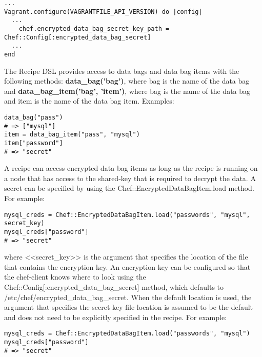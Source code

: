 \begin{lstlisting}[label=lst:my-cloud-chef-databag12,title=my-cloud/Vagrantfile]
...
Vagrant.configure(VAGRANTFILE_API_VERSION) do |config|
  ...
    chef.encrypted_data_bag_secret_key_path = Chef::Config[:encrypted_data_bag_secret]
  ...
end
\end{lstlisting}

The Recipe DSL provides access to data bags and data bag items with the following methods: \textbf{data\_bag('bag')}, where bag is the name of the data bag and \textbf{data\_bag\_item('bag', 'item')}, where bag is the name of the data bag and item is the name of the data bag item. Examples:

\begin{lstlisting}[label=lst:my-cloud-chef-databag13,title=my-cloud/Vagrantfile]
data_bag("pass")
# => ["mysql"]
item = data_bag_item("pass", "mysql")
item["password"]
# => "secret"
\end{lstlisting}

A recipe can access encrypted data bag items as long as the recipe is running on a node that has access to the shared-key that is required to decrypt the data. A secret can be specified by using the Chef::EncryptedDataBagItem.load method. For example:

\begin{lstlisting}[label=lst:my-cloud-chef-databag14,title=my-cloud/Vagrantfile]
mysql_creds = Chef::EncryptedDataBagItem.load("passwords", "mysql", secret_key)
mysql_creds["password"]
# => "secret"
\end{lstlisting}

where <<secret\_key>> is the argument that specifies the location of the file that contains the encryption key. An encryption key can be configured so that the chef-client knows where to look using the Chef::Config[:encrypted\_data\_bag\_secret] method, which defaults to /etc/chef/encrypted\_data\_bag\_secret. When the default location is used, the argument that specifies the secret key file location is assumed to be the default and does not need to be explicitly specified in the recipe. For example:

\begin{lstlisting}[label=lst:my-cloud-chef-databag14,title=my-cloud/Vagrantfile]
mysql_creds = Chef::EncryptedDataBagItem.load("passwords", "mysql")
mysql_creds["password"]
# => "secret"
\end{lstlisting}
